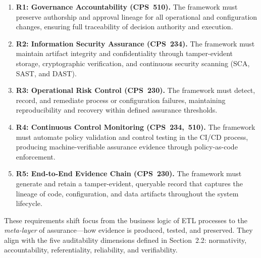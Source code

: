 \begin{enumerate}
  \item \textbf{R1: Governance Accountability (CPS~510).}  
        The framework must preserve authorship and approval lineage for all
        operational and configuration changes, ensuring full traceability of
        decision authority and execution.

  \item \textbf{R2: Information Security Assurance (CPS~234).}  
        The framework must maintain artifact integrity and confidentiality
        through tamper-evident storage, cryptographic verification, and
        continuous security scanning (SCA, SAST, and DAST).

  \item \textbf{R3: Operational Risk Control (CPS~230).}  
        The framework must detect, record, and remediate process or
        configuration failures, maintaining reproducibility and recovery within
        defined assurance thresholds.

  \item \textbf{R4: Continuous Control Monitoring (CPS~234,~510).}  
        The framework must automate policy validation and control testing in the
        CI/CD process, producing machine-verifiable assurance evidence through
        policy-as-code enforcement.

  \item \textbf{R5: End-to-End Evidence Chain (CPS~230).}  
        The framework must generate and retain a tamper-evident, queryable
        record that captures the lineage of code, configuration, and data
        artifacts throughout the system lifecycle.
\end{enumerate}

\noindent
These requirements shift focus from the business logic of ETL processes to the
\textit{meta-layer} of assurance—how evidence is produced, tested, and
preserved. They align with the five auditability dimensions defined in
Section~2.2: normativity, accountability, referentiality, reliability, and
verifiability.

